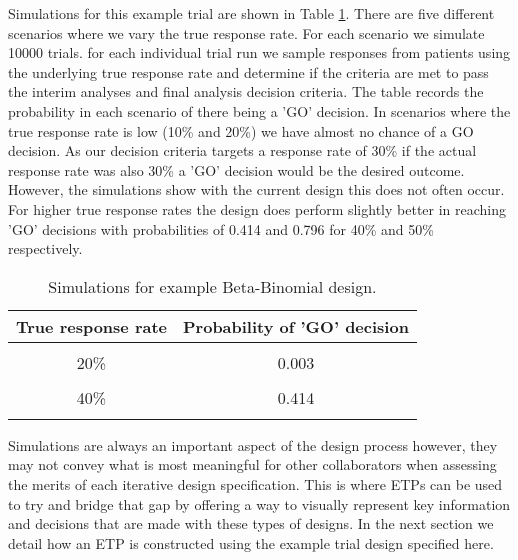 Simulations for this example trial are shown in Table \ref{tab_etp:exampleBBsims}. There are five different scenarios where we vary the true response rate. For each scenario we simulate 10000 trials. for each individual trial run we sample responses from patients using the underlying true response rate and determine if the criteria are met to pass the interim analyses and final analysis decision criteria. The table records the probability in each scenario of there being a 'GO' decision. In scenarios where the true response rate is low (10\% and 20\%) we have almost no chance of a GO decision. As our decision criteria targets a response rate of 30\% if the actual response rate was also 30\% a 'GO' decision would be the desired outcome. However, the simulations show with the current design this does not often occur. For higher true response rates the design does perform slightly better in reaching 'GO' decisions with probabilities of 0.414 and 0.796 for 40\% and 50\% respectively. 

\begin{table}[H]
	
	\caption{\label{tab_etp:exampleBBsims}Simulations for example Beta-Binomial design.}
	\centering
	\begin{tabular}[t]{cc}
		\toprule
		True response rate & Probability of 'GO' decision\\
		\midrule
		\cellcolor{gray!6}{10\%} & \cellcolor{gray!6}{0.000}\\
		20\% & 0.003\\
		\cellcolor{gray!6}{30\%} & \cellcolor{gray!6}{0.078}\\
		40\% & 0.414\\
		\cellcolor{gray!6}{50\%} & \cellcolor{gray!6}{0.796}\\
		\bottomrule
	\end{tabular}
\end{table}

Simulations are always an important aspect of the design process however, they may not convey what is most meaningful for other collaborators when assessing the merits of each iterative design specification. This is where ETPs can be used to try and bridge that gap by offering a way to visually represent key information and decisions that are made with these types of designs. In the next section we detail how an ETP is constructed using the example trial design specified here. 


